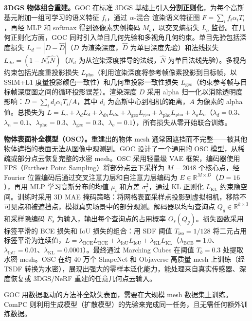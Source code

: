 \textbf{3DGS 物体组合重建。}GOC 在标准 3DGS 基础上引入\textbf{分割正则化}，为每个高斯基元附加一组可学习的语义特征 $f_i$，通过 $\alpha$-混合 渲染语义特征图 $F = \sum_i f_i \alpha_i T_i$，再经 MLP 和 softmax 得到逐像素实例掩码 $M_o$，以交叉熵损失 $L_o$ 监督。在几何正则化方面，GOC 同时引入单目几何先验和多视角几何约束。单目先验包括深度损失 $L_d = |D - \hat{D}|$（$D$ 为渲染深度，$\hat{D}$ 为单目深度先验）和法线损失 $L_{dn} = (1 - N_d^T \hat{N})$（$N_d$ 为从渲染深度推导的法线，$\hat{N}$ 为单目法线先验）。多视角约束包括光度重投影损失 $L_{\text{pho}}$（利用渲染深度将参考帧像素投影到目标帧，以 SSIM+L1 度量投影颜色一致性）和几何重投影一致性损失 $L_{\text{geo}}$（约束参考帧与目标帧深度图之间的循环投影误差）。渲染深度 $D$ 采用 alpha 归一化以消除透明度影响：$D = \sum_i d_i \alpha_i T_i / A$，其中 $d_i$ 为高斯中心到相机的距离，$A$ 为像素的 alpha 值。总损失为 $L = L_c + \lambda_d L_d + \lambda_{dn} L_{dn} + \lambda_{\text{geo}} L_{\text{geo}} + \lambda_{\text{pho}} L_{\text{pho}} + \lambda_o L_o$（$\lambda_d=0.3$、$\lambda_n=0.1$、$\lambda_{\text{pho}}=0.3$、$\lambda_{\text{geo}}=0.3$、$\lambda_o=0.1$），所有损失从零开始联合训练。

\textbf{物体表面补全模型（OSC）。}重建出的物体 mesh 通常因遮挡而不完整——被其他物体遮挡的表面无法从图像中观测到。GOC 设计了一个通用的 OSC 模型，从稀疏或部分点云恢复完整的水密 mesh。OSC 采用轻量级 VAE 框架，编码器使用 FPS（Farthest Point Sampling）将部分点云下采样为 $M=2048$ 个核心点，经 Fourier 位置编码后通过交叉注意力层和自注意力层编码为 $E \in \mathbb{R}^{M \times D}$（$D=16$），再用 MLP 学习高斯分布的均值 $\mu_i$ 和方差 $\sigma_i^2$，通过 KL 正则化 $L_{\text{KL}}$ 约束隐空间。训练时采用 3D MAE 掩码策略：将网格表面采样点投影到虚拟相机，移除不可见点和被遮挡点，模拟真实场景中的部分观测。解码器以均匀查询点 $Q_g \in \mathbb{R}^{k \times 3}$ 和采样隐编码 $E_s$ 为输入，输出每个查询点的占用概率 $O_s(Q_g)$。损失函数采用标签平滑的 BCE 损失和 IoU 损失的组合：用 SDF 阈值 $T_{\text{iso}} = 1/128$ 将二元占用标签平滑为连续值，$L = \lambda_{\text{BCE}} L_{\text{BCE}} + \lambda_{\text{IoU}} L_{\text{IoU}} + \lambda_{\text{KL}} L_{\text{KL}}$（$\lambda_{\text{BCE}}=1.0$、$\lambda_{\text{IoU}}=0.01$、$\lambda_{\text{KL}}=0.0001$）。最终通过 Marching Cubes 在阈值 $T_b=0.3$ 处提取水密 mesh。OSC 在约 40 万个 ShapeNet 和 Objaverse 高质量 mesh 上训练（经 TSDF 转换为水密），展现出强大的零样本泛化能力，能处理来自真实传感器、深度恢复或 3DGS/NeRF 重建的任意几何点云输入。

GOC 用数据驱动的方法补全缺失表面，需要在大规模 mesh 数据集上训练。ComPC 则利用生成模型（扩散模型）的先验来完成同一任务，且无需任何额外训练数据。

